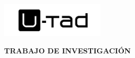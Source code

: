 \begin{center}
    \includegraphics[width=5cm]{figures/logo_utad_negro.png} %

    {\large \textcolor{darkgray}{\University}}
\end{center}


\vspace{6cm} %


\begin{center}
    \textbf{\LARGE {\thesisTitle}}
    
    \vspace{1cm} %

    \textbf{\normalsize \textsc{TRABAJO DE INVESTIGACIÓN}}
    
    \vspace{0.5cm} %

    {\large \Degree}
\end{center}


\vspace{4.5cm} %


